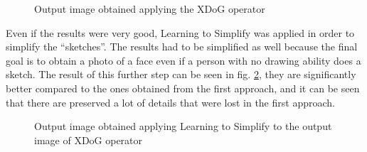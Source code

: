 \begin{figure}[htbp]
    \centering
     \quad
    \caption{Output image obtained applying the XDoG operator}
    \label{fig:xdogRes}
\end{figure}

\noindent Even if the results were very good, Learning to Simplify was applied in order to simplify the “sketches”. The results had to be simplified as well because the final goal is to obtain a photo of a face even if a person with no drawing ability does a sketch.
The result of this further step can be seen in fig. \ref{fig:xdogSimplifyRes}, they are significantly better compared to the ones obtained from the first approach, and it can be seen that there are preserved a lot of details that were lost in the first approach. 

\begin{figure}[htbp]
    \centering
     \quad
    \caption{Output image obtained applying Learning to Simplify to the output image of XDoG operator}
    \label{fig:xdogSimplifyRes}
\end{figure}